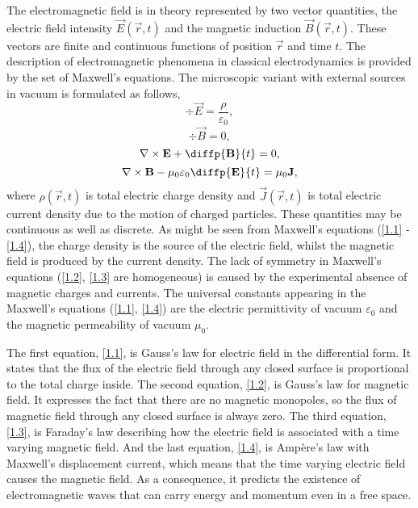 The electromagnetic field is in theory represented by two vector quantities, the electric field intensity $ \vec{E}\left( \vec{r}, t \right) $ and the magnetic induction $ \vec{B}\left( \vec{r}, t \right) $. These vectors are finite and continuous functions of position $ \vec{r} $ and time $ t $. The description of electromagnetic phenomena in classical electrodynamics is provided by the set of Maxwell's equations. The microscopic variant with external sources in vacuum is formulated as follows,
\begin{equation}
\label{1.1}
\div{\vec{E}} = \frac{\rho}{\varepsilon_0},
\end{equation}
\begin{equation}
\label{1.2}
\div{\vec{B}} = 0,
\end{equation}
\begin{equation}
\label{1.3}
\rot{\vec{E}} + \diffp{\vec{B}}{t} = 0,
\end{equation}
\begin{equation}
\label{1.4}
\rot{\vec{B}} - \mu_0 \varepsilon_0 \diffp{\vec{E}}{t}= \mu_0 \vec{J},
\end{equation}
where $ \rho\left( \vec{r}, t \right) $ is total electric charge density and $ \vec{J}\left( \vec{r}, t \right) $ is total electric current density due to the motion of charged particles. These quantities may be continuous as well as discrete. As might be seen from Maxwell's equations (\ref{1.1} - \ref{1.4}), the charge density is the source of the electric field, whilst the magnetic field is produced by the current density. The lack of symmetry in Maxwell's equations (\ref{1.2}, \ref{1.3} are homogeneous) is caused by the experimental absence of magnetic charges and currents. The universal constants appearing in the Maxwell's equations (\ref{1.1}, \ref{1.4}) are the electric permittivity of vacuum $ \varepsilon_0 $ and the magnetic permeability of vacuum $ \mu_0 $.

The first equation, \ref{1.1}, is Gauss's law for electric field in the differential form. It states that the flux of the electric field through any closed surface is proportional to the total charge inside. The second equation, \ref{1.2}, is Gauss's law for magnetic field. It expresses the fact that there are no magnetic monopoles, so the flux of magnetic field through any closed surface is always zero. The third equation, \ref{1.3}, is Faraday's law describing how the electric field is associated with a time varying magnetic field. And the last equation, \ref{1.4}, is Amp\`ere's law with Maxwell's displacement current, which means that the time varying electric field causes the magnetic field. As a consequence, it predicts the existence of electromagnetic waves that can carry energy and momentum even in a free space.

